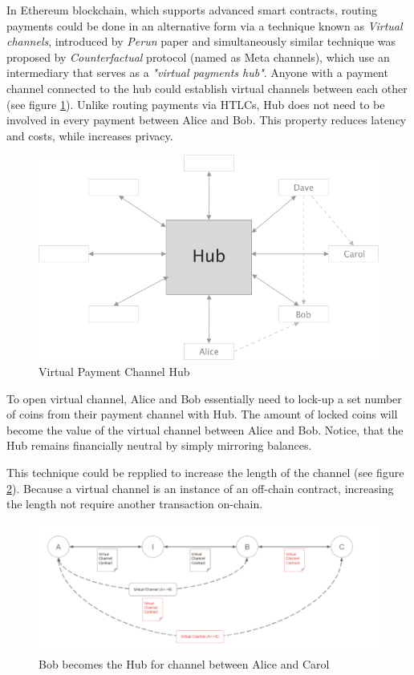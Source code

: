 \documentclass[a4paper,12pt]{article}
\begin{document}
In Ethereum blockchain, which supports advanced smart contracts, routing payments 
could be done in an alternative form via a technique known as \textit{Virtual 
channels}, introduced by \textit{Perun} paper \cite{perun} and simultaneously 
similar technique was proposed by \textit{Counterfactual} protocol (named as Meta 
channels), which use an intermediary that serves as a \textit{"virtual payments 
hub"}. Anyone with a payment channel connected to the hub could establish virtual
channels between each other (see figure \ref{img:hub}). Unlike routing payments 
via HTLCs, Hub does not need to be involved in every payment between Alice and 
Bob. This property reduces latency and costs, while increases privacy.

\begin{figure}[H]
    \centering
    \includegraphics[scale=0.5]{img/hub}
    \caption{Virtual Payment Channel Hub}
    \label{img:hub}
\end{figure}

To open virtual channel, Alice and Bob essentially need to lock-up a set number
of coins from their payment channel with Hub. The amount of locked coins will 
become the value of the virtual channel between Alice and Bob. Notice, that the 
Hub remains financially neutral by simply mirroring balances.

This technique could be repplied to increase the length of the channel (see 
figure \ref{img:virtual-channels}). Because a virtual channel is an instance of 
an off-chain contract, increasing the length not require another transaction 
on-chain.

\begin{figure}[H]
    \centering
    \includegraphics[scale=0.6]{img/virtual-channels}
    \caption{Bob becomes the Hub for channel between Alice and Carol}
    \label{img:virtual-channels}
\end{figure}
\end{document}
